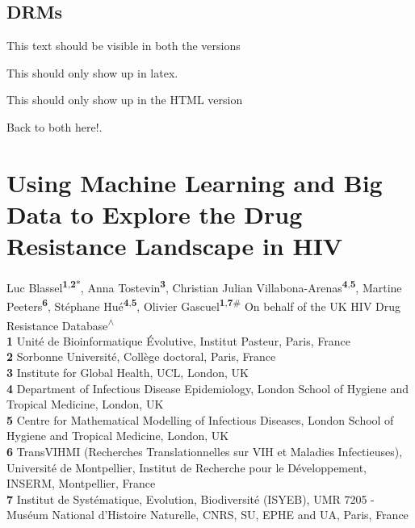 \documentclass[
  11,
]{scrbook}
\begin{document}
\hypertarget{drms}{%
\section{DRMs}\label{drms}}

This text should be visible in both the versions

This should only show up in latex.

\begin{htmlonly}
This should only show up in the HTML version

\end{htmlonly}

Back to both here!.

\hypertarget{HIV-paper}{%
\chapter{Using Machine Learning and Big Data to Explore the Drug Resistance Landscape in HIV}\label{HIV-paper}}

Luc Blassel\textsuperscript{\textbf{1},\textbf{2}*}, Anna Tostevin\textsuperscript{\textbf{3}}, Christian Julian
Villabona-Arenas\textsuperscript{\textbf{4},\textbf{5}}, Martine Peeters\textsuperscript{\textbf{6}}, Stéphane Hué\textsuperscript{\textbf{4},\textbf{5}}, Olivier
Gascuel\textsuperscript{\textbf{1},\textbf{7}\#} On behalf of the UK HIV Drug Resistance
Database\textsuperscript{\(\wedge\)}\\

\textbf{1} Unité de Bioinformatique Évolutive, Institut Pasteur, Paris,
France\\
\textbf{2} Sorbonne Université, Collège doctoral, Paris, France\\
\textbf{3} Institute for Global Health, UCL, London, UK\\
\textbf{4} Department of Infectious Disease Epidemiology, London School of
Hygiene and Tropical Medicine, London, UK\\
\textbf{5} Centre for Mathematical Modelling of Infectious Diseases, London
School of Hygiene and Tropical Medicine, London, UK\\
\textbf{6} TransVIHMI (Recherches Translationnelles sur VIH et Maladies
Infectieuses), Université de Montpellier, Institut de Recherche pour le
Développement, INSERM, Montpellier, France\\
\textbf{7} Institut de Systématique, Evolution, Biodiversité (ISYEB), UMR
7205 - Muséum National d'Histoire Naturelle, CNRS, SU, EPHE and UA,
Paris, France
\end{document}

